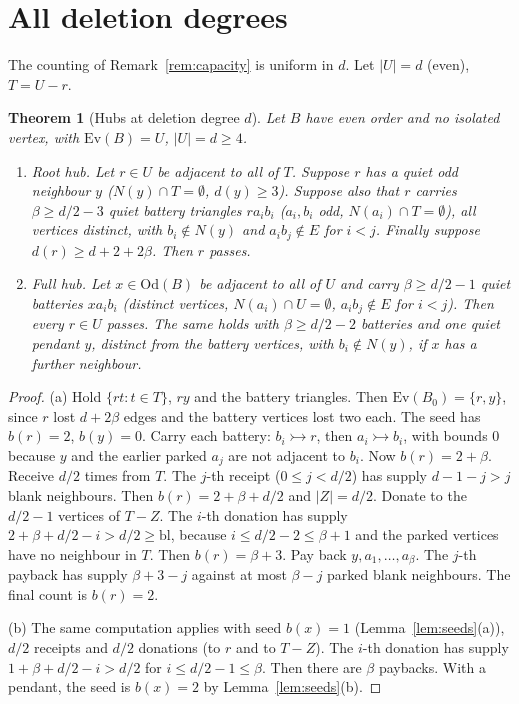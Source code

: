 \documentclass[11pt]{amsart}
\newtheorem{theorem}{Theorem}[section]
\theoremstyle{definition}
\newcommand{\Ev}{\mathrm{Ev}}
\newcommand{\Od}{\mathrm{Od}}
\newcommand{\tr}{\rightarrowtail}   %
\newcommand{\bl}{\mathrm{bl}}
\begin{document}
\section{All deletion degrees}\label{sec:general}

The counting of Remark~\ref{rem:capacity} is uniform in $d$. Let $|U|=d$ (even), $T=U-r$.

\begin{theorem}[Hubs at deletion degree $d$]\label{thm:general}
Let $B$ have even order and no isolated vertex, with $\Ev(B)=U$, $|U|=d\ge4$.
\begin{enumerate}[label=(\alph*)]
\item \emph{Root hub.} Let $r\in U$ be adjacent to all of $T$. Suppose $r$ has a quiet odd
neighbour $y$ ($N(y)\cap T=\emptyset$, $d(y)\ge3$). Suppose also that $r$ carries $\beta\ge d/2-3$
quiet battery triangles $ra_ib_i$ ($a_i,b_i$ odd, $N(a_i)\cap T=\emptyset$), all vertices
distinct, with $b_i\notin N(y)$ and $a_ib_j\notin E$ for $i<j$. Finally suppose $d(r)\ge d+2+2\beta$.
Then $r$ passes.
\item \emph{Full hub.} Let $x\in\Od(B)$ be adjacent to all of $U$ and carry $\beta\ge d/2-1$ quiet
batteries $xa_ib_i$ (distinct vertices, $N(a_i)\cap U=\emptyset$, $a_ib_j\notin E$ for $i<j$).
Then every $r\in U$ passes. The same holds with $\beta\ge d/2-2$ batteries and one quiet pendant
$y$, distinct from the battery vertices, with $b_i\notin N(y)$, if $x$ has a further neighbour.
\end{enumerate}
\end{theorem}

\begin{proof}
(a) Hold $\{rt:t\in T\}$, $ry$ and the battery triangles. Then $\Ev(B_0)=\{r,y\}$, since $r$ lost
$d+2\beta$ edges and the battery vertices lost two each. The seed has $b(r)=2$, $b(y)=0$. Carry
each battery: $b_i\tr r$, then $a_i\tr b_i$, with bounds $0$ because $y$ and the earlier parked
$a_j$ are not adjacent to $b_i$. Now $b(r)=2+\beta$. Receive $d/2$ times from $T$. The $j$-th
receipt ($0\le j<d/2$) has supply $d-1-j>j$ blank neighbours. Then $b(r)=2+\beta+d/2$ and
$|Z|=d/2$. Donate to the $d/2-1$ vertices of $T-Z$. The $i$-th donation has supply
$2+\beta+d/2-i>d/2\ge\bl$, because $i\le d/2-2\le\beta+1$ and the parked vertices have no
neighbour in $T$. Then $b(r)=\beta+3$. Pay back $y,a_1,\dots,a_\beta$. The $j$-th payback has
supply $\beta+3-j$ against at most $\beta-j$ parked blank neighbours. The final count is
$b(r)=2$.

(b) The same computation applies with seed $b(x)=1$ (Lemma~\ref{lem:seeds}(a)), $d/2$ receipts and
$d/2$ donations (to $r$ and to $T-Z$). The $i$-th donation has supply $1+\beta+d/2-i>d/2$ for
$i\le d/2-1\le\beta$. Then there are $\beta$ paybacks. With a pendant, the seed is $b(x)=2$ by
Lemma~\ref{lem:seeds}(b).
\end{proof}
\end{document}
